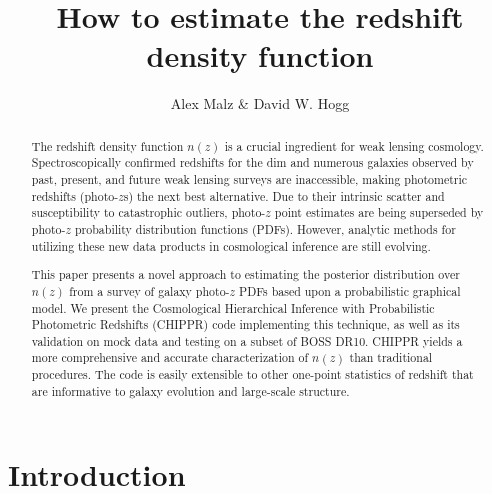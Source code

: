 \documentclass[preprint]{aastex}
\begin{document}
\title{How to estimate the redshift density function}

\author{Alex Malz \& David W. Hogg}


\begin{abstract}
The redshift density function $n(z)$ is a crucial ingredient for weak lensing cosmology.  Spectroscopically confirmed redshifts for the dim and numerous galaxies observed by past, present, and future weak lensing surveys are inaccessible, making photometric redshifts (photo-$z$s) the next best alternative.  Due to their intrinsic scatter and susceptibility to catastrophic outliers, photo-$z$ point estimates are being superseded by photo-$z$ probability distribution functions (PDFs).  However, analytic methods for utilizing these new data products in cosmological inference are still evolving.

This paper presents a novel approach to estimating the posterior distribution over $n(z)$ from a survey of galaxy photo-$z$ PDFs based upon a probabilistic graphical model.  We present the Cosmological Hierarchical Inference with Probabilistic Photometric Redshifts (CHIPPR) code implementing this technique, as well as its validation on mock data and testing on a subset of BOSS DR10.  CHIPPR yields a more comprehensive and accurate characterization of $n(z)$ than traditional procedures.  The code is easily extensible to other one-point statistics of redshift that are informative to galaxy evolution and large-scale structure.

\end{abstract}


\section{Introduction}
\label{sec:introduction}
\end{document}
